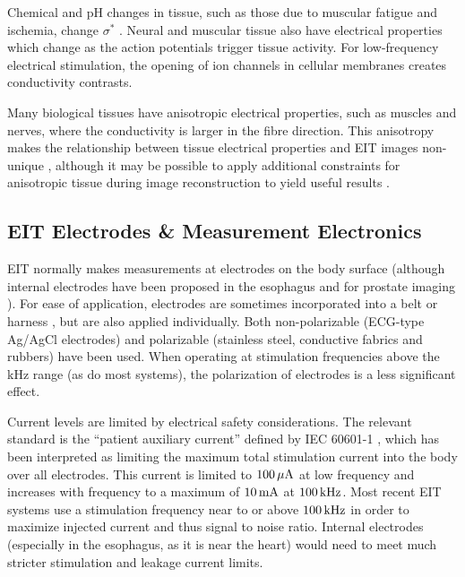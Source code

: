 \documentclass[12pt]{article} \usepackage[margin=3cm]{geometry} \usepackage[margin=20pt,font=small,labelfont=bf]{caption}\def\TBLWIDA{35mm}\def\TBLWIDB{95mm}
\begin{document}
Chemical and pH changes in tissue, such as those due to
muscular fatigue and ischemia, change $\sigma^*$
\cite{Packham2012Frequency}.
Neural and muscular tissue also have electrical properties
which change as the action potentials trigger tissue activity.
For low-frequency electrical stimulation, the opening of
ion channels in cellular membranes \cite{Aristovich2014Neural}
creates conductivity contrasts. 

Many biological tissues have anisotropic electrical properties,
such as muscles and nerves, where the conductivity
is larger in the fibre direction.
This anisotropy makes the relationship between
tissue electrical properties and EIT images
non-unique \cite{Lee1989Anisotopic}, although
it may be possible to apply additional constraints for
anisotropic tissue
during image reconstruction to yield useful results
 \cite{Lionheart2010Finite}.

\subsection{EIT Electrodes \& Measurement Electronics}


EIT normally makes measurements at electrodes on the body surface 
(although internal electrodes have been proposed in the
esophagus \cite{Schuessler1995Esophageal}
 and for prostate imaging \cite{Borsic2009Prostate}).
For ease of application, electrodes are sometimes incorporated into a belt or
harness \cite{Waldmann2017Interface}, but are also applied individually. 
Both non-polarizable (ECG-type Ag/AgCl electrodes) and 
         polarizable (stainless steel, conductive fabrics and rubbers)
have been used. When operating at stimulation frequencies above
the kHz range (as do most systems), the polarization of electrodes is
a less significant effect.

Current levels are limited by electrical safety considerations.
The relevant standard is the ``patient auxiliary current''
defined by IEC 60601-1 \cite{IEC60601}, which has been interpreted
as limiting the maximum total stimulation current into the body over all
electrodes. 
This current is limited to $\rm 100\,\mu A$ at low frequency
and increases with frequency to a maximum of $\rm 10\,mA$ at $\rm 100\,kHz$.
Most recent EIT systems use a stimulation frequency 
near to or above $\rm 100\,kHz$ in order to maximize
injected current and thus signal to noise ratio.
Internal electrodes \cite{Schuessler1995Esophageal}
(especially in the esophagus, as it is near the heart)
would need to meet much stricter stimulation and leakage current limits.
\end{document}

